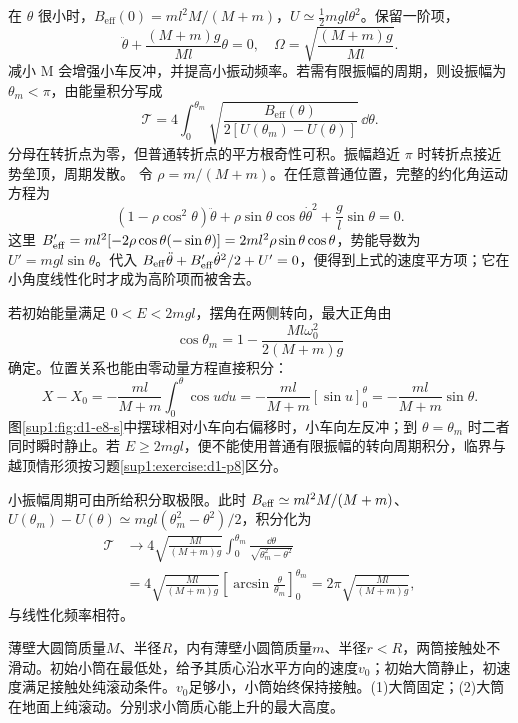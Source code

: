 \begin{solution}
在 $\theta$ 很小时，$B_{\text{eff}}(0)=ml^2M/(M+m)$，$U\simeq\tfrac12mgl\theta^2$。保留一阶项，
\[
\ddot\theta+\frac{(M+m)g}{Ml}\theta=0,
\quad\boxed{\Omega=\sqrt{\frac{(M+m)g}{Ml}}}.
\]
减小 M 会增强小车反冲，并提高小振动频率。若需有限振幅的周期，则设振幅为 $\theta_m<\pi$，由能量积分写成
\[
\boxed{\mathcal T=4\int_0^{\theta_m}
\sqrt{\frac{B_{\text{eff}}(\theta)}{2[U(\theta_m)-U(\theta)]}}\,\dd\theta}.
\]
分母在转折点为零，但普通转折点的平方根奇性可积。振幅趋近 $\pi$ 时转折点接近势垒顶，周期发散。
令 $\rho=m/(M+m)$。在任意普通位置，完整的约化角运动方程为
\[
(1-\rho\cos^2\theta)\ddot\theta
+\rho\sin\theta\cos\theta\dot\theta^2+\frac gl\sin\theta=0.
\]
这里 $B_{\rm eff}'=ml^2[-2\rho\cos\theta(-\sin\theta)]=2ml^2\rho\sin\theta\cos\theta$，势能导数为 $U'=mgl\sin\theta$。代入 $B_{\rm eff}\ddot\theta+B_{\rm eff}'\dot\theta^2/2+U'=0$，便得到上式的速度平方项；它在小角度线性化时才成为高阶项而被舍去。

若初始能量满足 $0<E<2mgl$，摆角在两侧转向，最大正角由
\[
\cos\theta_m=1-\frac{Ml\omega_0^2}{2(M+m)g}
\]
确定。位置关系也能由零动量方程直接积分：
\[
X-X_0=-\frac{ml}{M+m}\int_0^\theta\cos u\dd u
=-\frac{ml}{M+m}[\sin u]_0^\theta
=-\frac{ml}{M+m}\sin\theta.
\]
图\ref{sup1:fig:d1-e8-s}中摆球相对小车向右偏移时，小车向左反冲；到 $\theta=\theta_m$ 时二者同时瞬时静止。若 $E\ge2mgl$，便不能使用普通有限振幅的转向周期积分，临界与越顶情形须按习题\ref{sup1:exercise:d1-p8}区分。

小振幅周期可由所给积分取极限。此时 $B_{\rm eff}\simeq ml^2M/(M+m)$、$U(\theta_m)-U(\theta)\simeq mgl(\theta_m^2-\theta^2)/2$，积分化为
\[
\begin{aligned}
\mathcal T&\longrightarrow4\sqrt{\frac{Ml}{(M+m)g}}
\int_0^{\theta_m}\frac{\dd\theta}{\sqrt{\theta_m^2-\theta^2}}\\
&=4\sqrt{\frac{Ml}{(M+m)g}}\left[\arcsin\frac\theta{\theta_m}\right]_0^{\theta_m}
=2\pi\sqrt{\frac{Ml}{(M+m)g}},
\end{aligned}
\]
与线性化频率相符。

\end{solution}



\begin{example}[大圆筒内的小圆筒]\label{ex:hw1-8}

薄壁大圆筒质量$M$、半径$R$，内有薄壁小圆筒质量$m$、半径$r<R$，两筒接触处不滑动。初始小筒在最低处，给予其质心沿水平方向的速度$v_0$；初始大筒静止，初速度满足接触处纯滚动条件。$v_0$足够小，小筒始终保持接触。(1)大筒固定；(2)大筒在地面上纯滚动。分别求小筒质心能上升的最大高度。

\end{example}


